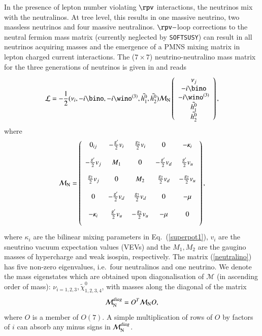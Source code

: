 \documentclass[final,3p,times,pdflatex]{elsarticle}
\def\SOFTSUSY{{\tt SOFTSUSY}}
\begin{document}
In the presence of lepton number violating $\rpv$ interactions, the neutrinos
mix with the neutralinos. At tree level, this results in one massive 
neutrino, two massless neutrinos and four massive neutralinos. $\rpv-$loop
corrections to the neutral 
fermion mass matrix (currently neglected by \SOFTSUSY) can result in all
neutrinos acquiring masses and the emergence of a PMNS mixing matrix in lepton
charged current interactions. 
The ($7 \times
7$) neutrino-neutralino mass matrix for the three generations of
neutrinos is given in \cite{Allanach:2003eb} and reads  
\begin{eqnarray}
{\cal L}= -\frac{1}{2} (\nu_i, -i \bino, -i \wino^{(3)},
\tilde{h_1^0}, \tilde{h_2^0}
)
{\cal M}_{\rm N} \left ( \begin{array}{c}
\nu_j \\ -i \bino \\  -i \wino^{(3)} \\ \tilde{h_1^0} \\
\tilde{h_2^0} \end{array} \right ), 
\end{eqnarray}
where 
\begin{eqnarray}
{\cal M}_{\rm N} = \left ( \begin{array}{ccccc}
 0_{ij}& -\frac{g'}{2} v_i   &  \frac{g_2}{2} v_i   &  0   & - \kappa_i \\[4mm]
 -\frac{g'}{2} v_j    &   M_1   &   0  &  -\frac{g'}{2} v_d   &  \frac{g'}{2} v_u \\[4mm]
  \frac{g_2}{2} v_j   &   0  &   M_2   &  \frac{g_2}{2} v_d   &  -\frac{g_2}{2} v_u\\[4mm]
 0    &   -\frac{g'}{2} v_d  &  \frac{g_2}{2} v_d    &   0  & -\mu \\[4mm]
 - \kappa_i    &  \frac{g'}{2} v_u   &  -\frac{g_2}{2} v_u   & -\mu    & 0 \\[4mm]
\end{array} \right ),\label{neutralino}
\end{eqnarray}
where
$\kappa_i$ are the bilinear mixing parameters in Eq.~(\ref{superpot1}),
$v_i$ are the sneutrino vacuum expectation values (VEVs) and the $M_{1},M_2$ are
the gaugino masses of hypercharge and weak isospin, respectively. The matrix
(\ref{neutralino}) has five non-zero 
eigenvalues, i.e.\ four neutralinos and one neutrino. We denote
the mass eigenstates which are obtained upon diagonalisation of 
${\mathcal M}$ (in ascending order of mass):
$\nu_{i=1,2,3},\tilde{\chi}^0_{1,2,3,4}$, 
with masses along the diagonal of the matrix
\begin{equation}
{\mathcal M}_{\rm N}^{diag} = O^T {\mathcal M}_{\rm N} O, \label{Nmix}
\end{equation}
where $O$ is a member of $O(7)$. A simple multiplication of rows of $O$ by
factors of $i$ can absorb any minus signs in ${\mathcal M}_{\rm N}^{diag}$.
\end{document}
